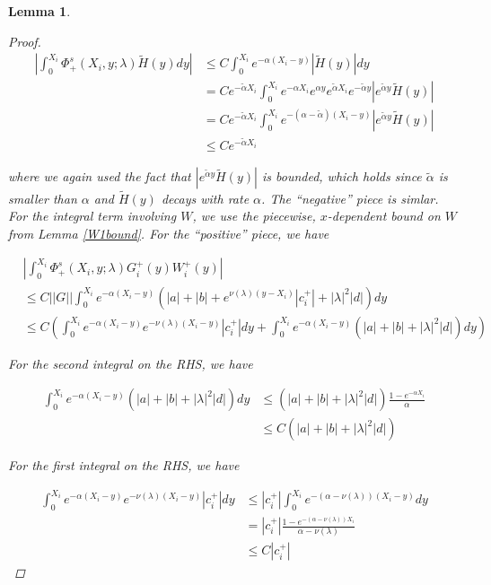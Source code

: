 \documentclass[12pt]{article}
\newtheorem{lemma}{Lemma}
\begin{document}
\begin{lemma}
\begin{proof}
\begin{align*}
\left| \int_0^{X_i} \Phi^s_+(X_i, y; \lambda) \tilde{H}(y) dy \right| 
&\leq C \int_0^{X_i} e^{-\alpha (X_i - y)}|\tilde{H}(y)| dy \\
&= C e^{-\tilde{\alpha}X_i} \int_0^{X_i} e^{-\alpha X_i} e^{\alpha y}  e^{\tilde{\alpha}X_i} e^{-\tilde{\alpha}y} |e^{\tilde{\alpha}y} \tilde{H}(y)| \\
&= C e^{-\tilde{\alpha}X_i} \int_0^{X_i} e^{-(\alpha - \tilde{\alpha})(X_i-y)} |e^{\tilde{\alpha}y} \tilde{H}(y)|\\
&\leq C e^{-\tilde{\alpha}X_i} 
\end{align*}

where we again used the fact that $|e^{\tilde{\alpha}y} \tilde{H}(y)|$ is bounded, which holds since $\tilde{\alpha}$ is smaller than $\alpha$ and $\tilde{H}(y)$ decays with rate $\alpha$. The ``negative'' piece is simlar.\\

For the integral term involving $W$, we use the piecewise, $x$-dependent bound on $W$ from Lemma \ref{W1bound}. For the ``positive'' piece, we have

\begin{align*}
&\left| \int_0^{X_i} \Phi^s_+(X_i, y; \lambda) G_i^+(y) W_i^+(y) \right| \\
&\leq C ||G|| \int_0^{X_i} e^{-\alpha(X_i - y)}(|a| + |b| + e^{\nu(\lambda)(y - X_i)}|c_i^+| + |\lambda|^2 |d| ) dy \\
&\leq C \left( \int_0^{X_i} e^{-\alpha(X_i - y)}e^{-\nu(\lambda)(X_i - y)}|c_i^+|dy + \int_0^{X_i} e^{-\alpha(X_i - y)}(|a| + |b| + |\lambda|^2 |d| ) dy \right)
\end{align*}

For the second integral on the RHS, we have

\begin{align*}
\int_0^{X_i} e^{-\alpha(X_i - y)}(|a| + |b| + |\lambda|^2 |d| ) dy &\leq (|a| + |b| + |\lambda|^2 |d|)\frac{1 - e^{-\alpha X_i}}{\alpha} \\
&\leq C (|a| + |b| + |\lambda|^2 |d|)
\end{align*}

For the first integral on the RHS, we have

\begin{align*}
\int_0^{X_i} e^{-\alpha(X_i - y)}e^{-\nu(\lambda)(X_i - y)}|c_i^+|dy &\leq
|c_i^+| \int_0^{X_i} e^{-(\alpha - \nu(\lambda))(X_i - y)} dy \\
&= |c_i^+| \frac{1 - e^{-(\alpha - \nu(\lambda)) X_i}}{\alpha - \nu(\lambda)} \\
&\leq C |c_i^+| 
\end{align*}


\end{proof}
\end{lemma}
\end{document}
